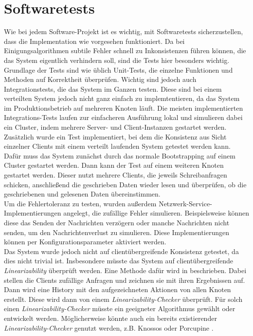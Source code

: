 \section{Softwaretests}

Wie bei jedem Software-Projekt ist es wichtig, mit Softwaretests sicherzustellen, dass die Implementation wie vorgesehen funktioniert. Da bei Einigungsalgorithmen subtile Fehler schnell zu Inkonsistenzen führen können, die das System eigentlich verhindern soll, sind die Tests hier besonders wichtig. Grundlage der Tests sind wie üblich Unit-Tests, die einzelne Funktionen und Methoden auf Korrektheit überprüfen. Wichtig sind jedoch auch Integrationstests, die das System im Ganzen testen. Diese sind bei einem verteilten System jedoch nicht ganz einfach zu implemtentieren, da das System im Produktionsbetrieb auf mehreren Knoten läuft. Die meisten implementierten Integrations-Tests laufen zur einfacheren Ausführung lokal und simulieren dabei ein Cluster, indem mehrere Server- und Client-Instanzen gestartet werden. \\
 Zusätzlich wurde ein Test implementiert, bei dem die Konsistenz aus Sicht einzelner Clients mit einem verteilt laufenden System getestet werden kann. Dafür muss das System zunächst durch das normale Bootstrapping auf einem Cluster gestartet werden. Dann kann der Test auf einem weiteren Knoten gestartet werden. Dieser nutzt mehrere Clients, die jeweils Schreibanfragen schicken, anschließend die geschrieben Daten wieder lesen und überprüfen, ob die geschriebenen und gelesenen Daten übereinstimmen. \\
 Um die Fehlertoleranz zu testen, wurden außerdem Netzwerk-Service-Implementierungen angelegt, die zufällige Fehler simulieren. Beispielsweise können diese das Senden der Nachrichten verzögern oder manche Nachrichten nicht senden, um den Nachrichtenverlust zu simulieren. Diese Implementierungen können per Konfigurationsparameter aktiviert werden. \\
 Das System wurde jedoch nicht auf clientübergreifende Konsistenz getestet, da dies nicht trivial ist. Insbesondere müsste das System auf clientübergreifende \textit{Linearizability} überprüft werden. Eine Methode dafür wird in \cite{testing} beschrieben. Dabei stellen die Clients zufällige Anfragen und zeichnen sie mit ihren Ergebnissen auf. Dann wird eine History mit den aufgezeichneten Aktionen von allen Knoten erstellt. Diese wird dann von einem \textit{Linearizability-Checker} überprüft. Für solch einen \textit{Linearizability-Checker} müsste ein geeigneter Algorithmus gewählt oder entwickelt werden. Möglicherweise könnte auch ein bereits existierender \textit{Linearizability-Checker} genutzt werden, z.B. Knossos \cite{knossos} oder Porcupine \cite{porcupine}.\\


